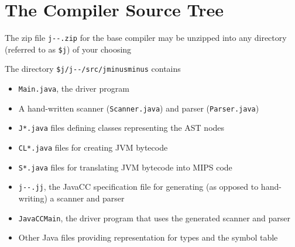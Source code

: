 \documentclass[8pt,a4paper,compress]{beamer}
\begin{document}
\section{The \protect \jmm Compiler Source Tree}
\begin{frame}[fragile]
\pause

The zip file \lstinline{j--.zip} for the base \jmm compiler may be unzipped into any directory (referred to as \lstinline{$j}) of your choosing

\pause\bigskip

The directory \lstinline{$j/j--/src/jminusminus} contains
\begin{itemize}
\pause
\item \lstinline{Main.java}, the driver program

\pause
\item A hand-written scanner (\lstinline{Scanner.java}) and parser (\lstinline{Parser.java})

\pause
\item \lstinline{J*.java} files defining classes representing the AST nodes

\pause
\item \lstinline{CL*.java} files for creating JVM bytecode

\pause
\item \lstinline{S*.java} files for translating JVM bytecode into MIPS code

\pause
\item \lstinline{j--.jj}, the JavaCC specification file for generating (as opposed to hand-writing) a scanner and parser

\pause
\item \lstinline{JavaCCMain}, the driver program that uses the generated scanner and parser

\pause
\item Other Java files providing representation for types and the symbol table
\end{itemize}
\end{frame}
\end{document}
